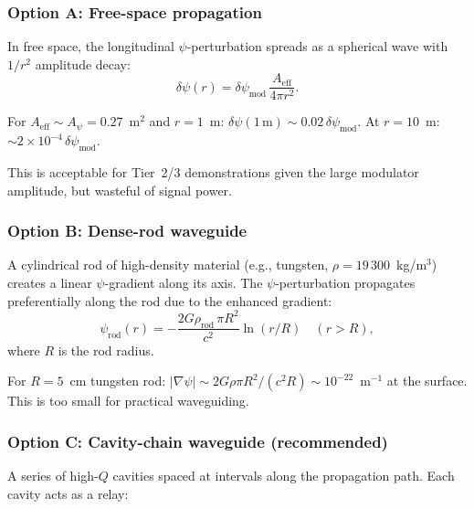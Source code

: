 \documentclass[11pt,letterpaper]{article}
\newcommand{\ee}[1]{\times 10^{#1}}
\newcommand{\psifield}{\psi}
\begin{document}
\subsubsection{Option A: Free-space propagation}

In free space, the longitudinal $\psifield$-perturbation spreads
as a spherical wave with $1/r^2$ amplitude decay:
\begin{equation}
\delta\psifield(r) = \delta\psifield_\text{mod}\,
\frac{A_\text{eff}}{4\pi r^2}.
\label{eq:free_space}
\end{equation}

For $A_\text{eff} \sim A_\psi = 0.27$~m$^2$ and $r = 1$~m:
$\delta\psifield(1\,\text{m}) \sim 0.02\,\delta\psifield_\text{mod}$.
At $r = 10$~m: $\sim 2\ee{-4}\,\delta\psifield_\text{mod}$.

This is acceptable for Tier~2/3 demonstrations given the large
modulator amplitude, but wasteful of signal power.

\subsubsection{Option B: Dense-rod waveguide}

A cylindrical rod of high-density material (e.g., tungsten,
$\rho = 19\,300$~kg/m$^3$) creates a linear $\psifield$-gradient
along its axis. The $\psifield$-perturbation propagates
preferentially along the rod due to the enhanced gradient:
\begin{equation}
\psifield_\text{rod}(r) = -\frac{2G\rho_\text{rod}\,\pi R^2}{c^2}
\ln(r/R) \quad (r > R),
\label{eq:rod_psi}
\end{equation}
where $R$ is the rod radius.

For $R = 5$~cm tungsten rod:
$|\nabla\psifield| \sim 2G\rho\pi R^2/(c^2 R) \sim 10^{-22}$~m$^{-1}$
at the surface. This is too small for practical waveguiding.

\subsubsection{Option C: Cavity-chain waveguide (recommended)}

A series of high-$Q$ cavities spaced at intervals along the
propagation path. Each cavity acts as a relay:
\end{document}
